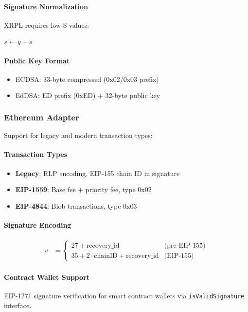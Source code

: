 \paragraph{Signature Normalization} XRPL requires low-S values:
\begin{algorithmic}[1]
    \State $s \leftarrow q - s$
\EndIf
\end{algorithmic}

\paragraph{Public Key Format}
\begin{itemize}
\item ECDSA: 33-byte compressed (0x02/0x03 prefix)
\item EdDSA: ED prefix (0xED) + 32-byte public key
\end{itemize}

\subsubsection{Ethereum Adapter}

Support for legacy and modern transaction types:

\paragraph{Transaction Types}
\begin{itemize}
\item \textbf{Legacy}: RLP encoding, EIP-155 chain ID in signature
\item \textbf{EIP-1559}: Base fee + priority fee, type 0x02
\item \textbf{EIP-4844}: Blob transactions, type 0x03
\end{itemize}

\paragraph{Signature Encoding}
\begin{align*}
v &= \begin{cases}
27 + \text{recovery\_id} & \text{(pre-EIP-155)} \\
35 + 2 \cdot \text{chainID} + \text{recovery\_id} & \text{(EIP-155)}
\end{cases}
\end{align*}

\paragraph{Contract Wallet Support} EIP-1271 signature verification for smart contract wallets via \texttt{isValidSignature} interface.

